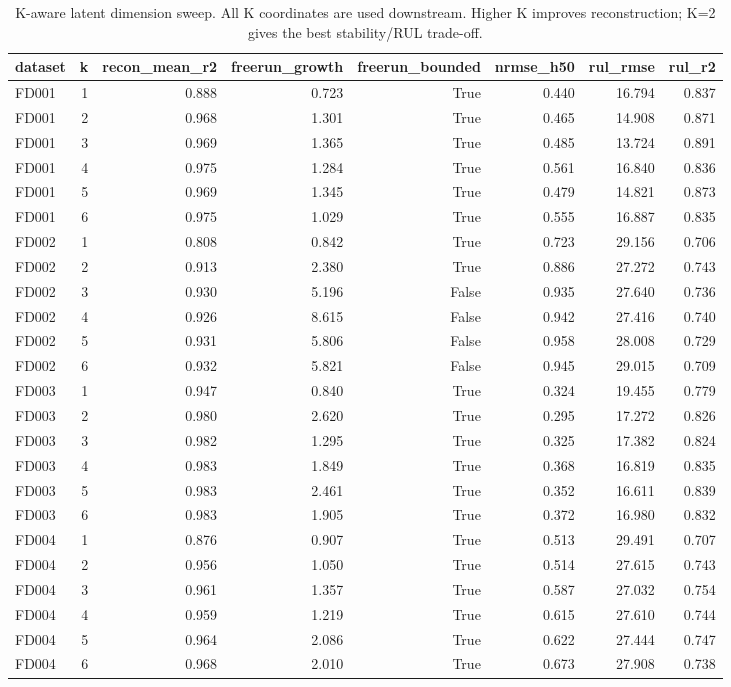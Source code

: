 \begin{table}[t]
\centering
\caption{K-aware latent dimension sweep. All K coordinates are used downstream. Higher K improves reconstruction; K=2 gives the best stability/RUL trade-off.}
\label{tab:k_sweep}
\begin{tabular}{lrrrrrrr}
\toprule
dataset & k & recon\_mean\_r2 & freerun\_growth & freerun\_bounded & nrmse\_h50 & rul\_rmse & rul\_r2 \\
\midrule
FD001 & 1 & 0.888 & 0.723 & True & 0.440 & 16.794 & 0.837 \\
FD001 & 2 & 0.968 & 1.301 & True & 0.465 & 14.908 & 0.871 \\
FD001 & 3 & 0.969 & 1.365 & True & 0.485 & 13.724 & 0.891 \\
FD001 & 4 & 0.975 & 1.284 & True & 0.561 & 16.840 & 0.836 \\
FD001 & 5 & 0.969 & 1.345 & True & 0.479 & 14.821 & 0.873 \\
FD001 & 6 & 0.975 & 1.029 & True & 0.555 & 16.887 & 0.835 \\
FD002 & 1 & 0.808 & 0.842 & True & 0.723 & 29.156 & 0.706 \\
FD002 & 2 & 0.913 & 2.380 & True & 0.886 & 27.272 & 0.743 \\
FD002 & 3 & 0.930 & 5.196 & False & 0.935 & 27.640 & 0.736 \\
FD002 & 4 & 0.926 & 8.615 & False & 0.942 & 27.416 & 0.740 \\
FD002 & 5 & 0.931 & 5.806 & False & 0.958 & 28.008 & 0.729 \\
FD002 & 6 & 0.932 & 5.821 & False & 0.945 & 29.015 & 0.709 \\
FD003 & 1 & 0.947 & 0.840 & True & 0.324 & 19.455 & 0.779 \\
FD003 & 2 & 0.980 & 2.620 & True & 0.295 & 17.272 & 0.826 \\
FD003 & 3 & 0.982 & 1.295 & True & 0.325 & 17.382 & 0.824 \\
FD003 & 4 & 0.983 & 1.849 & True & 0.368 & 16.819 & 0.835 \\
FD003 & 5 & 0.983 & 2.461 & True & 0.352 & 16.611 & 0.839 \\
FD003 & 6 & 0.983 & 1.905 & True & 0.372 & 16.980 & 0.832 \\
FD004 & 1 & 0.876 & 0.907 & True & 0.513 & 29.491 & 0.707 \\
FD004 & 2 & 0.956 & 1.050 & True & 0.514 & 27.615 & 0.743 \\
FD004 & 3 & 0.961 & 1.357 & True & 0.587 & 27.032 & 0.754 \\
FD004 & 4 & 0.959 & 1.219 & True & 0.615 & 27.610 & 0.744 \\
FD004 & 5 & 0.964 & 2.086 & True & 0.622 & 27.444 & 0.747 \\
FD004 & 6 & 0.968 & 2.010 & True & 0.673 & 27.908 & 0.738 \\
\bottomrule
\end{tabular}
\end{table}